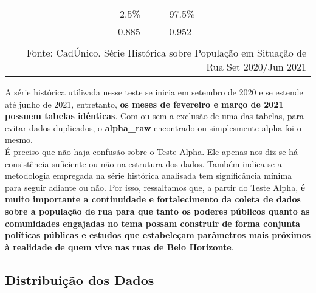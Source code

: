 \documentclass[12pt]{article}
\begin{document}
\begin{table}[htbp]
\begin{adjustbox}{max width=\linewidth}
\begin{tabular}{rrrrrrrrrrr}
         &      &      &      & \cellcolor[rgb]{ .851,  .851,  .851}2.5\% & \cellcolor[rgb]{ .851,  .851,  .851} & \multicolumn{1}{l}{\cellcolor[rgb]{ .851,  .851,  .851}97.5\%} &      &      &      &  \\
         &      &      &      & \cellcolor[rgb]{ .851,  .851,  .851}0.885 & \cellcolor[rgb]{ .851,  .851,  .851} & \multicolumn{1}{l}{\cellcolor[rgb]{ .851,  .851,  .851}0.952 } &      &      &      &  \\
         &      &      &      &      &      &      &      &      &      &  \\
    \midrule
    \multicolumn{11}{r}{Fonte: CadÚnico. Série Histórica sobre População em Situação de Rua Set 2020/Jun 2021} \\
    \hline
    \end{tabular}%
    \end{adjustbox}
  \label{tab:tab10}%
\end{table}%
\vspace{0.5cm}

A série histórica utilizada nesse teste se inicia em setembro de 2020 e se estende até junho de 2021, entretanto, \textbf{os meses de fevereiro e março de 2021 possuem tabelas idênticas}. Com ou sem a exclusão de uma das tabelas, para evitar dados duplicados, o \textbf{alpha\_raw} encontrado ou simplesmente alpha foi o mesmo.\\ 

É preciso que não haja confusão sobre o Teste Alpha. Ele apenas nos diz se há consistência suficiente ou não na estrutura dos dados. Também indica se a metodologia empregada na série histórica analisada tem significância mínima para seguir adiante ou não. Por isso, ressaltamos que, a partir do Teste Alpha, \textbf{é muito importante a continuidade e fortalecimento da coleta de dados sobre a população de rua para que tanto os poderes públicos quanto as comunidades engajadas no tema possam construir de forma conjunta políticas públicas e estudos que estabeleçam parâmetros mais próximos à realidade de quem vive nas ruas de Belo Horizonte}.\\


\subsection{Distribuição dos Dados}
\label{distribuicao_dados}
\end{document}
